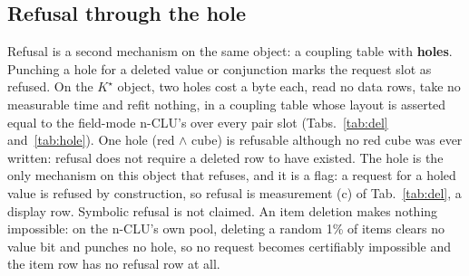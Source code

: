 \documentclass{article} %
\newcommand{\Kstar}{\ensuremath{K^{\star}}}
\begin{document}
\subsection{Refusal through the hole}
\label{sec:hole}

Refusal is a second mechanism on the same object: a coupling table with \textbf{holes}.
Punching a hole for a deleted value or conjunction marks the request slot as refused. On the
$\Kstar$ object, two holes cost a byte each, read no data rows, take no measurable time and refit nothing, in
a coupling table whose layout is asserted equal to the field-mode n-CLU's over every pair
slot (Tabs.~\ref{tab:del} and~\ref{tab:hole}). %
One hole (red $\wedge$ cube) is refusable although no red cube was ever written: refusal does
not require a deleted row to have existed. %
The hole is the only mechanism on this object that refuses, and it is a flag: a request for a
holed value is refused by construction, so refusal is measurement (c) of Tab.~\ref{tab:del}, a
display row. Symbolic refusal is not claimed. An item deletion makes nothing impossible: on the n-CLU's own pool, deleting a random
1\% of items clears no value bit and punches no hole, so no request becomes certifiably impossible
and the item row has no refusal row at all. %
\end{document}
